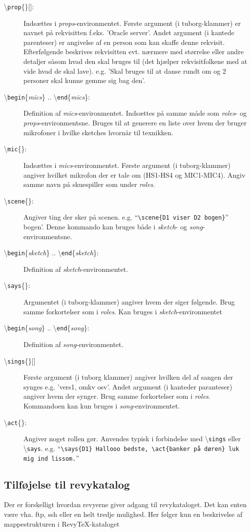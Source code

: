 \documentclass{article}
\newcommand{\env}[1]{\textit{#1}}
\newcommand{\cmd}[1]{\textbackslash \texttt{#1}}
\newcommand{\envbegin}[1]{\cmd{begin}\{\env{#1}\}}
\newcommand{\envend}[1]{\cmd{end}\{\env{#1}\}}
\newcommand{\example}[1]{``\texttt{#1}''}
\begin{document}
\begin{description}
\item[\cmd{prop}\{\}{[]}:] Indsættes i \env{props}-environmentet. Første argument (i
tuborg-klammer) er navnet på rekvisitten f.eks. 'Oracle server'. Andet
argument (i kantede parenteser) er angivelse af en person som kan skaffe
denne rekvisit. Efterfølgende beskrives rekvisitten evt. nærmere med
størrelse eller andre detaljer såsom hvad den skal bruges til (det
hjælper rekvisitfolkene med at vide hvad de skal lave). e.g. 'Skal
bruges til at danse rundt om og 2 personer skal kunne gemme sig bag
den'.
\item[\envbegin{mics} .. \envend{mics}:] Definition af \env{mics}-environmentet.
Indsættes på samme måde som \env{roles}- og \env{props}-environmentsne. Bruges til at generere
en liste over hvem der bruger mikrofoner i hvilke sketches hvornår til
texnikken.
\item[\cmd{mic}\{\}:] Indsættes i \env{mics}-environmentet. Første argument (i
tuborg-klammer) angiver hvilket mikrofon der er tale om (HS1-HS4 og
MIC1-MIC4). Angiv samme navn på skuespiller som under \env{roles}.
\item[\cmd{scene}\{\}:] Angiver ting der sker på scenen. e.g.
\example{\cmd{scene}\{D1 viser D2 bogen\}}
bogen'. Denne kommando kan bruges både i \env{sketch}- og
\env{song}-environmentsne.
\item[\envbegin{sketch} .. \envend{sketch}:] Definition af \env{sketch}-environmentet. 
\item[\cmd{says}\{\}:] Argumentet (i tuborg-klammer) angiver hvem der siger
følgende. Brug samme forkortelser som i \env{roles}. Kan bruges i
\env{sketch}-environmentet
\item[\envbegin{song} .. \envend{song}:] Definition af \env{song}-environmentet.
\item[\cmd{sings}\{\}{[]}] Første argument (i tuborg klammer) angiver
hvilken del af sangen der synges e.g. 'vers1, omkv osv'. Andet argument
(i kanteder paranteser) angiver hvem der synger. Brug samme forkortelser
som i \env{roles}. Kommandoen kan kun bruges i \env{song}-environmentet.
\item[\cmd{act}\{\}:] Angiver noget rollen gør. Anvendes typisk i
forbindelse med \cmd{sings} eller \cmd{says}. e.g. \example{\cmd{says}\{D1\}
Hallooo bedste, \cmd{act}\{banker på døren\} luk mig ind lissom.}
\end{description}

\subsection{Tilføjelse til revykatalog}
Der er forskelligt hvordan revyerne giver adgang til revykataloget. Det
kan enten være vha. ftp, ssh eller en helt tredje mulighed. Her følger
kun en beskrivelse af mappestrukturen i RevyTeX-kataloget
\end{document}
